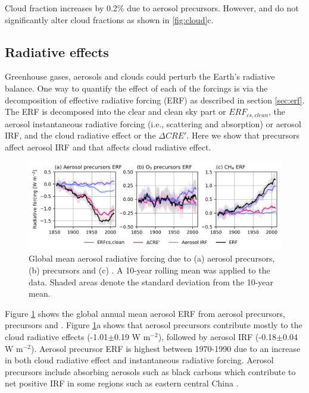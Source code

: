 Cloud fraction increases by 0.2\% due to aerosol precursors. However,  and  do not significantly alter cloud fractions as shown in \ref{fig:cloud}c. 




\subsection{Radiative effects}

Greenhouse gases, aerosols and clouds could perturb the Earth's radiative balance. One way to quantify the effect of each of the forcings is via the decomposition of effective radiative forcing (ERF) as described in section \ref{sec:erf}. The ERF is decomposed into the clear and clean sky part or $ERF_{cs,clean}$, the aerosol instantaneous radiative forcing (i.e., scattering and absorption) or aerosol IRF, and the cloud radiative effect or the $\Delta CRE'$. Here we show that  precursors affect aerosol IRF and that  affects cloud radiative effect.

\begin{figure}
    \centering
    \includegraphics[width=\linewidth]{Chapter3/Figs/f10_erf.png}
    \caption{Global mean aerosol radiative forcing due to (a) aerosol precursors, (b)  precursors and (c) . A 10-year rolling mean was applied to the data. Shaded areas denote the standard deviation from the 10-year mean.}
    \label{fig:erf}
\end{figure}

Figure \ref{fig:erf} shows the global annual mean aerosol ERF from aerosol precursors,  precursors and . Figure \ref{fig:erf}a shows that aerosol precursors contribute mostly to the cloud radiative effects (-1.01$\pm$0.19 W m$^{-2}$), followed by aerosol IRF (-0.18$\pm$0.04 W m$^{-2}$). Aerosol precursor ERF is highest between 1970-1990 due to an increase in both cloud radiative effect and instantaneous radiative forcing. Aerosol precursors include absorbing aerosols such as black carbons which contribute to net positive IRF in some regions such as eastern central China \citep{seoImpactsAerosolEmissions2020, oconnorAssessmentPreindustrialPresentday2021}. 


